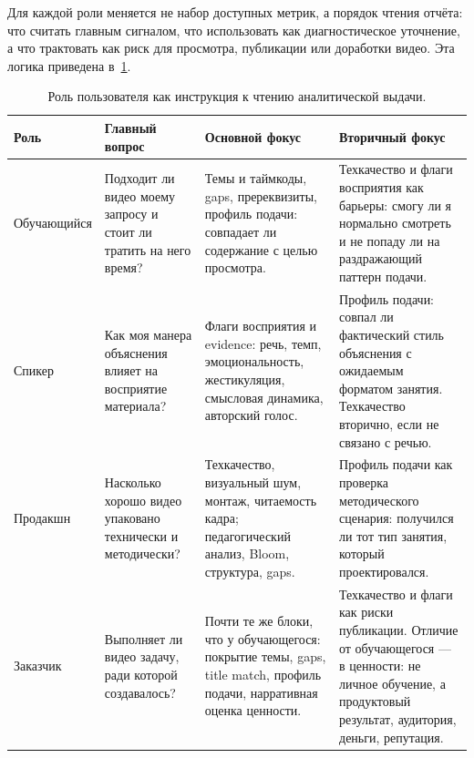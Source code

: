 Для каждой роли меняется не набор доступных метрик, а порядок чтения отчёта:
что считать главным сигналом, что использовать как диагностическое уточнение,
а что трактовать как риск для просмотра, публикации или доработки видео.
Эта логика приведена в~\cref{tab:user-roles}.


\begin{table}[!htbp]
\centering
\small
\renewcommand{\arraystretch}{1.15}
\begin{tabular}{p{} p{} p{} p{}}
\toprule
\textbf{Роль} & \textbf{Главный вопрос} & \textbf{Основной фокус} & \textbf{Вторичный фокус} \\
\midrule

Обучающийся &
Подходит ли видео моему запросу и стоит ли тратить на него время? &
Темы и таймкоды, gaps, пререквизиты, профиль подачи: совпадает ли содержание с целью просмотра. &
Техкачество и флаги восприятия как барьеры: смогу ли я нормально смотреть и не попаду ли на раздражающий паттерн подачи. \\

\midrule

Спикер &
Как моя манера объяснения влияет на восприятие материала? &
Флаги восприятия и evidence: речь, темп, эмоциональность, жестикуляция, смысловая динамика, авторский голос. &
Профиль подачи: совпал ли фактический стиль объяснения с ожидаемым форматом занятия. Техкачество вторично, если не связано с речью. \\

\midrule

Продакшн &
Насколько хорошо видео упаковано технически и методически? &
Техкачество, визуальный шум, монтаж, читаемость кадра; педагогический анализ, Bloom, структура, gaps. &
Профиль подачи как проверка методического сценария: получился ли тот тип занятия, который проектировался. \\

\midrule

Заказчик &
Выполняет ли видео задачу, ради которой создавалось? &
Почти те же блоки, что у обучающегося: покрытие темы, gaps, title match, профиль подачи, нарративная оценка ценности. &
Техкачество и флаги как риски публикации. Отличие от обучающегося — в ценности: не личное обучение, а продуктовый результат, аудитория, деньги, репутация. \\

\bottomrule
\end{tabular}
\caption{Роль пользователя как инструкция к чтению аналитической выдачи.}
\label{tab:user-roles}
\end{table}


